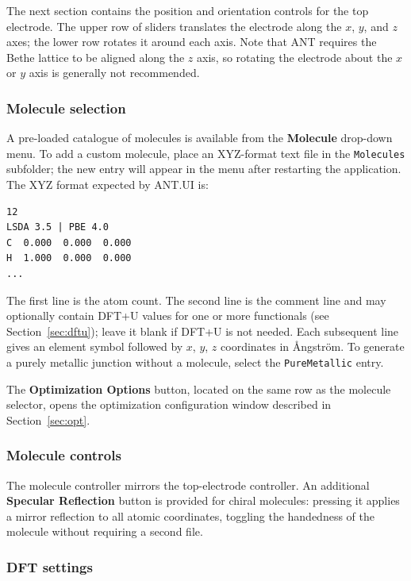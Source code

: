 \documentclass[12pt]{article}
\begin{document}
The next section contains the position and orientation controls for the top electrode. The upper row of sliders translates the electrode along the $x$, $y$, and $z$ axes; the lower row rotates it around each axis. Note that ANT requires the Bethe lattice to be aligned along the $z$ axis, so rotating the electrode about the $x$ or $y$ axis is generally not recommended.

\subsubsection*{Molecule selection}

A pre-loaded catalogue of molecules is available from the \textbf{Molecule} drop-down menu. To add a custom molecule, place an XYZ-format text file in the \texttt{Molecules} subfolder; the new entry will appear in the menu after restarting the application. The XYZ format expected by ANT.UI is:

\begin{verbatim}
12
LSDA 3.5 | PBE 4.0
C  0.000  0.000  0.000
H  1.000  0.000  0.000
...
\end{verbatim}

The first line is the atom count. The second line is the comment line and may optionally contain DFT+U values for one or more functionals (see Section~\ref{sec:dftu}); leave it blank if DFT+U is not needed. Each subsequent line gives an element symbol followed by $x$, $y$, $z$ coordinates in Ångström. To generate a purely metallic junction without a molecule, select the \texttt{PureMetallic} entry.

The \textbf{Optimization Options} button, located on the same row as the molecule selector, opens the optimization configuration window described in Section~\ref{sec:opt}.

\subsubsection*{Molecule controls}

The molecule controller mirrors the top-electrode controller. An additional \textbf{Specular Reflection} button is provided for chiral molecules: pressing it applies a mirror reflection to all atomic coordinates, toggling the handedness of the molecule without requiring a second file.

\subsubsection*{DFT settings}
\end{document}
